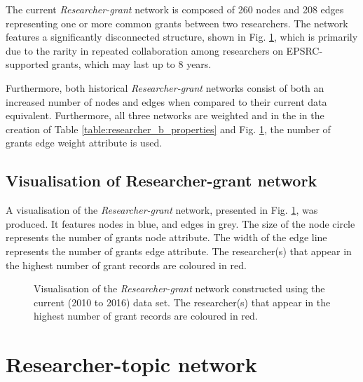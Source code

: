 The current \textit{Researcher-grant} network is composed of 260 nodes and 208 edges representing one or more common grants between two researchers. The network features a significantly disconnected structure, shown in Fig. \ref{figure:researcher_b_current_vis}, which is primarily due to the rarity in repeated collaboration among researchers on EPSRC-supported grants, which may last up to 8 years.

Furthermore, both historical \textit{Researcher-grant} networks consist of both an increased number of nodes and edges when compared to their current data equivalent. Furthermore, all three networks are weighted and in the in the creation of Table \ref{table:researcher_b_properties} and Fig. \ref{figure:researcher_b_current_vis}, the number of grants edge weight attribute is used.

\subsection{Visualisation of Researcher-grant network}

A visualisation of the \textit{Researcher-grant} network, presented in Fig. \ref{figure:researcher_b_current_vis}, was produced. It features nodes in blue, and edges in grey. The size of the node circle represents the number of grants node attribute. The width of the edge line represents the number of grants edge attribute. The researcher(s) that appear in the highest number of grant records are coloured in red.

\begin{figure}[htpb]
    \centering
    \caption[Visualisation of the \textit{Researcher-grant} network constructed using the current (2010 to 2016) data set.]{Visualisation of the \textit{Researcher-grant} network constructed using the current (2010 to 2016) data set. The researcher(s) that appear in the highest number of grant records are coloured in red.}
    \label{figure:researcher_b_current_vis}
\end{figure}

\section{Researcher-topic network}

